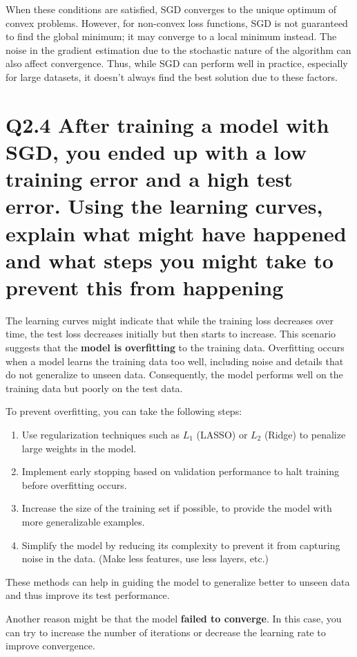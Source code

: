 \documentclass[11pt]{article}
\begin{document}
When these conditions are satisfied, SGD converges to the unique optimum of convex problems. However, for non-convex loss functions, SGD is not guaranteed to find the global minimum; it may converge to a local minimum instead. The noise in the gradient estimation due to the stochastic nature of the algorithm can also affect convergence. Thus, while SGD can perform well in practice, especially for large datasets, it doesn't always find the best solution due to these factors.

\section{Q2.4 After training a model with SGD, you ended up with a low training error and a high test error. Using the learning curves, explain what might have happened and what steps you might take to prevent this from happening}

The learning curves might indicate that while the training loss decreases over time, the test loss decreases initially but then starts to increase. This scenario suggests that the \textbf{model is overfitting} to the training data. Overfitting occurs when a model learns the training data too well, including noise and details that do not generalize to unseen data. Consequently, the model performs well on the training data but poorly on the test data.

To prevent overfitting, you can take the following steps:
\begin{enumerate}
    \item Use regularization techniques such as \( L_1 \) (LASSO) or \( L_2 \) (Ridge) to penalize large weights in the model.
    \item Implement early stopping based on validation performance to halt training before overfitting occurs.
    \item Increase the size of the training set if possible, to provide the model with more generalizable examples.
    \item Simplify the model by reducing its complexity to prevent it from capturing noise in the data. (Make less features, use less layers, etc.)
\end{enumerate}

These methods can help in guiding the model to generalize better to unseen data and thus improve its test performance.

Another reason might be that the model \textbf{failed to converge}. In this case, you can try to increase the number of iterations or decrease the learning rate to improve convergence.
\end{document}
